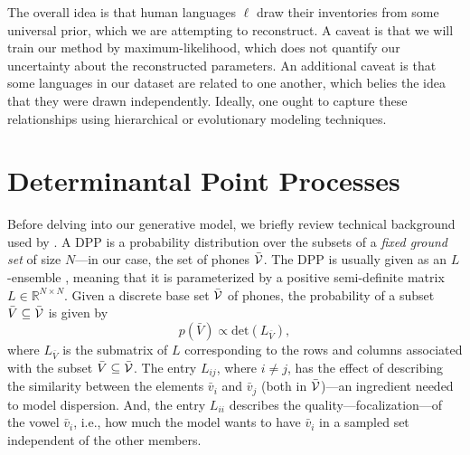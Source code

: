 \documentclass[11pt,a4paper]{article}
\newcommand{\bigV}{{\cal V}}
\newcommand{\bigVbar}{\bar{\bigV}}
\newcommand{\Vbar}{\bar{V}}
\newcommand{\vbar}{\bar{v}}
\begin{document}
The overall idea is that human languages $\ell$ draw their inventories from some universal prior, which we are attempting to reconstruct.  A caveat is that we will train our method by maximum-likelihood, which does not quantify our uncertainty about the reconstructed parameters.  An additional caveat is that some languages in our dataset are related to one another, which belies the idea that they were drawn independently.  Ideally, one ought to capture these relationships using hierarchical or evolutionary modeling techniques.

\section{Determinantal Point Processes}

Before delving into our generative model, we briefly review technical
background used by .
A DPP is a probability distribution over the subsets of a {\em fixed ground set} of size $N$---in our case, the set of phones $\bigVbar$.  The DPP
is usually given as an $L$-ensemble \cite{borodin2005eynard}, meaning that it is parameterized by a positive semi-definite matrix $L \in \mathbb{R}^{N \times N}$. Given
a discrete base set $\bigVbar$ of phones, the probability of a subset $\Vbar \subseteq \bigVbar$ is given by
\begin{equation}
  p(\Vbar) \propto \text{det}\left(L_{\Vbar} \right),
\end{equation}
where $L_{\Vbar}$ is the submatrix of $L$ corresponding to the rows
and columns associated with the subset $\Vbar \subseteq \bigVbar$.
The entry $L_{ij}$, where $i \neq j$, has the effect of describing the similarity between the elements $\vbar_i$ and
$\vbar_j$ (both in $\bigVbar$)---an ingredient needed to
model dispersion. And, the entry $L_{ii}$ describes the quality---focalization---of the vowel $\vbar_i$, i.e., how much the model wants to have $\vbar_i$ in a sampled set independent of the other members.
\end{document}
